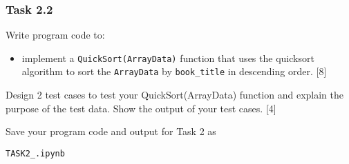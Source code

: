 \subsubsection*{Task 2.2 }

Write program code to: 
\begin{itemize}
\item implement a \texttt{QuickSort(ArrayData)} function that uses the quicksort
algorithm to sort the \texttt{ArrayData} by \texttt{book\_title} in
descending order. \hfill{} {[}8{]}
\end{itemize}
Design 2 test cases to test your QuickSort(ArrayData) function and
explain the purpose of the test data. Show the output of your test
cases. \hfill{}{[}4{]}

Save your program code and output for Task 2 as 

\texttt{TASK2\_<your name>.ipynb}